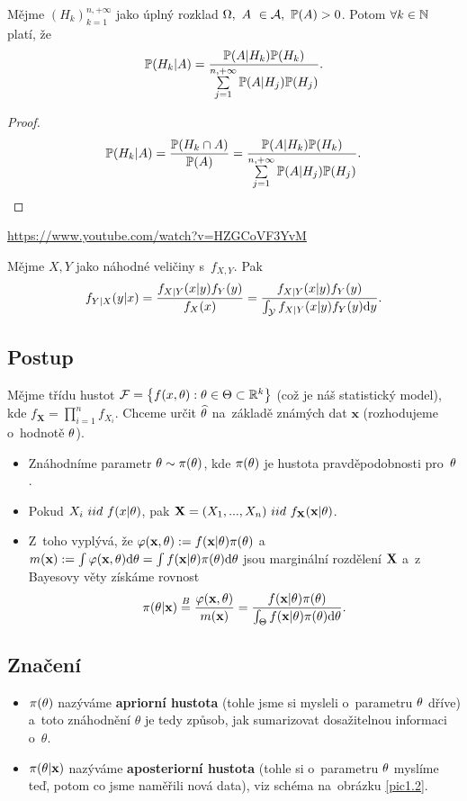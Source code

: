 \begin{theorem}[Bayesova] 
	Mějme $(H_k)_{k=1}^{n,+\infty}$ jako úplný rozklad $\Omega,~A~\in \mathcal{A} , ~\mathbb{P}(A)>0$. Potom $\forall k\in\mathbb{N}$ platí, že 
	\[
	\mathbb{P}(H_k|A)=\frac{\mathbb{P}(A|H_k)\mathbb{P}(H_k)}{\sum\limits_{j=1}^{n,+\infty}\mathbb{P}(A|H_j)\mathbb{P}(H_j)}.
	\]
	\begin{proof}
		$$\mathbb{P}(H_k|A)=\frac{\mathbb{P}(H_k\cap A)}{\mathbb{P}(A)}=\frac{\mathbb{P}(A|H_k)\mathbb{P}(H_k)}{\sum\limits_{j=1}^{n,+\infty}\mathbb{P}(A|H_j)\mathbb{P}(H_j)}.$$
	\end{proof}
\end{theorem}

\begin{example}[Steve]
\href{https://www.youtube.com/watch?v=HZGCoVF3YvM}{https://www.youtube.com/watch?v=HZGCoVF3YvM}
\end{example}
\begin{theorem}
	Mějme $X,Y$ jako náhodné veličiny s~$f_{X,Y}$. Pak
	$$ f_{Y|X}(y|x)=\frac{f_{X|Y}(x|y)f_Y(y)}{f_X(x)}=\frac{f_{X|Y}(x|y)f_Y(y)}{\int_{\mathcal{Y}} f_{X|Y}(x|y)f_Y(y)\mathrm{d} y}. $$
\end{theorem}

\subsection*{Postup}
Mějme třídu hustot $\mathcal{F}=\big\{ f(x,\theta):\theta\in\Theta\subset\mathbb{R}^k \big\}$ (což je náš statistický model), kde $f_\textbf{X}=\prod_{i=1}^n f_{X_i}$. Chceme určit $\widehat{\theta}$ na~základě známých dat $\textbf{x}$ (rozhodujeme o~hodnotě $\theta$). 

\begin{itemize}
	\item Znáhodníme parametr $\theta\sim\pi(\theta)$, kde $\pi(\theta)$ je hustota pravděpodobnosti pro~$\theta$.
	\item Pokud $X_i~iid~f(x|\theta)$, pak $ \textbf{X}=(X_1,...,X_n)~iid~f_{\textbf{X}}(\textbf{x}|\theta)$.
	\item Z~toho vyplývá, že $\varphi(\textbf{x},\theta):=f(\textbf{x}|\theta)\pi(\theta)$ a~$m(\textbf{x}):=\int\varphi(\textbf{x},\theta)\mathrm{d} \theta=\int f(\textbf{x}|\theta)\pi(\theta)\mathrm{d}\theta$ jsou marginální rozdělení $\textbf{X}$ a~z Bayesovy věty získáme rovnost 
	$$ \pi(\theta|\textbf{x})\stackrel{B}{=}\frac{\varphi(\textbf{x},\theta)}{m(\textbf{x})}=\frac{f(\textbf{x}|\theta)\pi(\theta)}{\int_\Theta f(\textbf{x}|\theta)\pi(\theta)\mathrm{d}\theta}. $$
\end{itemize}
\subsection*{Značení}
\begin{itemize}
\item 	$\pi(\theta)$ nazýváme \textbf{apriorní hustota} (tohle jsme si mysleli o~parametru $\theta$ dříve) a~toto znáhodnění $\theta$ je tedy způsob, jak sumarizovat dosažitelnou informaci o~$\theta$.
\item   $\pi(\theta|\textbf{x})$ nazýváme \textbf{aposteriorní hustota} (tohle si o~parametru $\theta$ myslíme teď, potom co jsme naměřili nová data), viz schéma na~obrázku \ref{pic1.2}.
\end{itemize}

